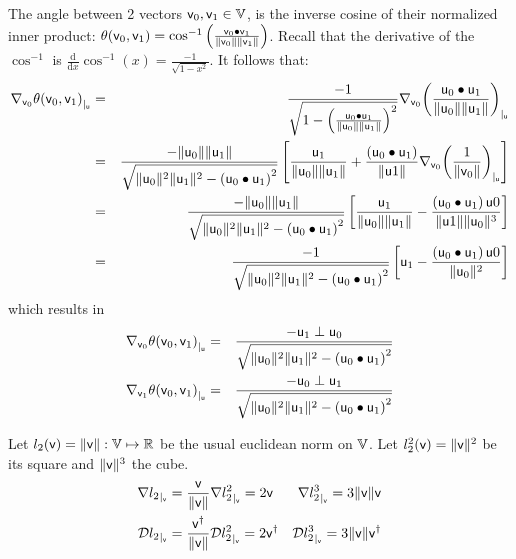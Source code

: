 The angle between 2 vectors $\mathsf{v}_0, \mathsf{v}_1 \in \mathbb{V}$,
is the inverse cosine of their normalized inner product:
$\theta(\mathsf{v}_0,\mathsf{v}_1)
=
\cos^{-1} \left( \frac{ \mathsf{v}_0 \bullet \mathsf{v}_1 } {\|\mathsf{v}_0\| \|\mathsf{v}_1\|} \right)$.
Recall that the derivative of the $\cos^{-1}$ is
$\frac{\mathrm d}{\mathrm dx} \cos^{-1}(x) = \frac{-1}{\sqrt{1 - x^2} }$.
It follows that:
\begin{eqnarray*}
{\mathbf \nabla}_{\mathsf{v}_0}{{\theta(\mathsf{v}_0,\mathsf{v}_1)}}_{\mid_{\mathsf{u}}}
& = &
\frac{-1}
{ \sqrt{1 - \left( \frac{\mathsf{u}_0 \bullet \mathsf{u}_1}{\| \mathsf{u}_0 \| \| \mathsf{u}_1 \|} \right)^2 }}
{\mathbf \nabla}_{\mathsf{v}_0}{{\left( \frac{\mathsf{u}_0 \bullet \mathsf{u}_1}{\| \mathsf{u}_0 \| \| \mathsf{u}_1 \|} \right)}}_{\mid_{\mathsf{u}}}
\\
& = &
\frac{-\|\mathsf{u}_0\|\|\mathsf{u}_1\|}
{ \sqrt{\|\mathsf{u}_0\|^2\|\mathsf{u}_1\|^2 - \left( \mathsf{u}_0 \bullet \mathsf{u}_1 \right)^2 }}
\left[
\frac{\mathsf{u}_1}{\|\mathsf{u}_0\|\|\mathsf{u}_1\|}
+
\frac{\left( \mathsf{u}_0 \bullet \mathsf{u}_1 \right)}{\| \mathsf{u}1 \|}
{\mathbf \nabla}_{\mathsf{v}_0}{{\left( \frac{1}{\| \mathsf{v}_0 \|} \right)}}_{\mid_{\mathsf{u}}}
\right]
\nonumber
\\
& = &
\frac{-\|\mathsf{u}_0\|\|\mathsf{u}_1\|}
{ \sqrt{\|\mathsf{u}_0\|^2\|\mathsf{u}_1\|^2 - \left( \mathsf{u}_0 \bullet \mathsf{u}_1 \right)^2 }}
\left[
\frac{\mathsf{u}_1}{\|\mathsf{u}_0\|\|\mathsf{u}_1\|}
-
\frac{\left( \mathsf{u}_0 \bullet \mathsf{u}_1 \right) \mathsf{u}0}{\| \mathsf{u}1 \| \|\mathsf{u}_0\|^3}
\right]
\nonumber
\\
& = &
\frac{-1}
{ \sqrt{\|\mathsf{u}_0\|^2\|\mathsf{u}_1\|^2 - \left( \mathsf{u}_0 \bullet \mathsf{u}_1 \right)^2 }}
\left[
\mathsf{u}_1
-
\frac{\left( \mathsf{u}_0 \bullet \mathsf{u}_1 \right) \mathsf{u}0}{\|\mathsf{u}_0\|^2}
\right]
\nonumber
\end{eqnarray*}
which results in
\begin{eqnarray}
\label{eq:angle_gradient}
\Gc{\v_0}{\theta(\v_0,\v_1)}{\u}
& = &
\frac{- \u_1 \perp \u_0}
{ \sqrt{\|\u_0\|^2\|\u_1\|^2 - \left( \u_0 \bullet \u_1 \right)^2 }}
\\
\Gc{\v_1}{\theta(\v_0,\v_1)}{\u}
& = &
\frac{- \u_0 \perp \u_1}
{ \sqrt{\|\u_0\|^2\|\u_1\|^2 - \left( \u_0 \bullet \u_1 \right)^2 }}
\nonumber
\end{eqnarray}

\label{sec:Euclidean-norm}

Let $l_2(\mathsf{v}) = \| \mathsf{v}  \|: \mathbb{V} \mapsto \mathbb{R}$
be the usual euclidean norm on $\mathbb{V}$.
Let $l_2^2(\mathsf{v}) = \| \mathsf{v}  \|^2 $
be its square and $ \| \mathsf{v}  \|^3$ the cube.
\begin{eqnarray}
\label{eq:l2-gradient}
\Gb{l_2}{\v} = \frac{ \v }{ \| \v  \|} &
\Gb{l_2^2}{\v} =  2\v &
\Gb{l_2^3}{\v} = 3 \| \v  \| \v \\
\Db{l_2}{\v} = \frac{ \v^\dagger }{ \| \v  \|} &
\Db{l_2^2}{\v} = 2\v{^\dagger} &
\Db{l_2^3}{\v} = 3 \| \v  \| \v^\dagger \nonumber
\end{eqnarray}


